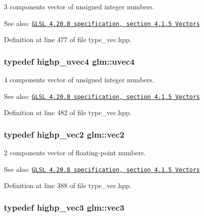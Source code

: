 3 components vector of unsigned integer numbers.

\begin{Desc}
\item[See also:]\href{http://www.opengl.org/registry/doc/GLSLangSpec.4.20.8.pdf}{\tt GLSL 4.20.8 specification, section 4.1.5 Vectors} \end{Desc}


Definition at line 477 of file type\_\-vec.hpp.\hypertarget{group__core__types_g1c426d19627b32b14f0089f7f4ba7b1d}{
\subsubsection[uvec4]{\setlength{\rightskip}{0pt plus 5cm}typedef highp\_\-uvec4 {\bf glm::uvec4}}}
\label{group__core__types_g1c426d19627b32b14f0089f7f4ba7b1d}


4 components vector of unsigned integer numbers.

\begin{Desc}
\item[See also:]\href{http://www.opengl.org/registry/doc/GLSLangSpec.4.20.8.pdf}{\tt GLSL 4.20.8 specification, section 4.1.5 Vectors} \end{Desc}


Definition at line 482 of file type\_\-vec.hpp.\hypertarget{group__core__types_ga1618f51db67eaa145db101d8c8431d8}{
\subsubsection[vec2]{\setlength{\rightskip}{0pt plus 5cm}typedef highp\_\-vec2 {\bf glm::vec2}}}
\label{group__core__types_ga1618f51db67eaa145db101d8c8431d8}


2 components vector of floating-point numbers.

\begin{Desc}
\item[See also:]\href{http://www.opengl.org/registry/doc/GLSLangSpec.4.20.8.pdf}{\tt GLSL 4.20.8 specification, section 4.1.5 Vectors} \end{Desc}


Definition at line 388 of file type\_\-vec.hpp.\hypertarget{group__core__types_g1c47e8b3386109bc992b6c48e91b0be7}{
\subsubsection[vec3]{\setlength{\rightskip}{0pt plus 5cm}typedef highp\_\-vec3 {\bf glm::vec3}}}
\label{group__core__types_g1c47e8b3386109bc992b6c48e91b0be7}


